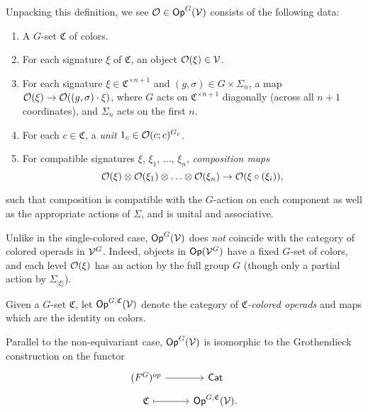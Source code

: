 \documentclass[a4paper,10pt
,draft
]{article}%
\renewcommand{\1}{\ensuremath{\mathbb{id}}}
\begin{document}
Unpacking this definition, we see $\mathcal{O} \in \mathsf{Op}^G(\mathcal V)$ consists of the following data:
\begin{enumerate}[label = (\arabic*)]
\item A $G$-set $\mathfrak C$ of colors.
\item For each signature $\xi$ of $\mathfrak C$, an object $\mathcal{O}(\xi) \in \mathcal V$.
\item For each signature $\xi \in \mathfrak C^{\times n+1}$ and $(g,\sigma) \in G\times \Sigma_n$, a map
      $\mathcal{O}(\xi) \to \mathcal{O}((g,\sigma)\cdot \xi)$,
      where $G$ acts on $\mathfrak C^{\times n+1}$ diagonally (across all $n+1$ coordinates), and $\Sigma_n$ acts on the first $n$.
\item For each $c \in \mathfrak C$, a \textit{unit} $1_c \in \mathcal{O}(c;c)^{G_c}$.
\item For compatible signatures $\xi$, $\xi_1$, $\ldots$, $\xi_n$, \textit{composition maps}
      \begin{equation}
            \mathcal{O}(\xi) \otimes \mathcal{O}(\xi_1) \otimes \ldots \otimes \mathcal{O}(\xi_n) \to \mathcal{O}(\xi \circ (\xi_i)),
      \end{equation}
\end{enumerate}
such that composition is
compatible with the $G$-action on each component as well as the appropriate actions of $\Sigma$,
and is unital and associative. 


\begin{remark}
	Unlike in the single-colored case, $\mathsf{Op}^G(\mathcal V)$ does \textit{not} coincide with the category of colored operads in $\mathcal V^G$.
	Indeed, objects in $\mathsf{Op}(\mathcal V^G)$ have a fixed $G$-set of colors,
        and each level $\mathcal{O}(\xi)$ has an action by the full group $G$
	(though only a partial action by $\Sigma_{|\xi|}$).
\end{remark}

\begin{definition}
      Given a $G$-set $\mathfrak C$, let $\mathsf{Op}^{G,\mathfrak C}(\mathcal V)$ denote the category of \textit{$\mathfrak C$-colored operads} and maps which are the identity on colors.
      
      Parallel to the non-equivariant case, $\mathsf{Op}^G(\mathcal V)$ is isomorphic to the Grothendieck construction on the functor
      \begin{equation}
            \begin{tikzcd}[row sep = tiny]
                  \mathsf (F^G)^{op} \arrow[r] & \mathsf{Cat}
                  \\
                  \mathfrak C \arrow[r, mapsto] & \Op^{G,\mathfrak C}(\V).
            \end{tikzcd}
      \end{equation}
\end{definition}
\end{document}
